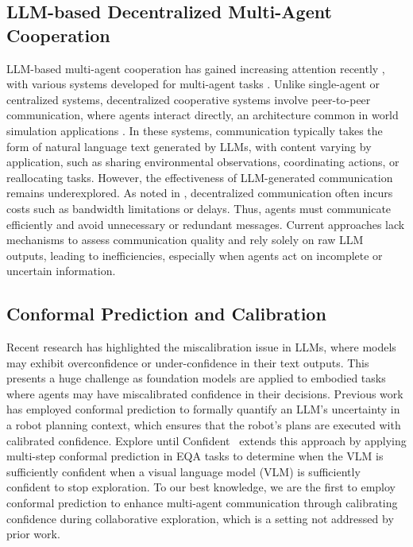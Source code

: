 \subsection{LLM-based Decentralized Multi-Agent Cooperation}
LLM-based multi-agent cooperation has gained increasing attention recently \cite{chan2023chateval,zhang2024lamma}, with various systems developed for multi-agent tasks \cite{hong2023metagpt,horton2023large,hua2023war,zhang2024towards,chen2024scalable,mandi2024roco}. 
Unlike single-agent or centralized systems, decentralized cooperative systems involve peer-to-peer communication, where agents interact directly, an architecture common in world simulation applications \cite{zhang2024agentcf,zhou2023sotopia}.
In these systems, communication typically takes the form of natural language text generated by LLMs, with content varying by application, such as sharing environmental observations, coordinating actions, or reallocating tasks. 
However, the effectiveness of LLM-generated communication remains underexplored. As noted in \cite{zhang2023building}, decentralized communication often incurs costs such as bandwidth limitations or delays. Thus, agents must communicate efficiently and avoid unnecessary or redundant messages. Current approaches lack mechanisms to assess communication quality and rely solely on raw LLM outputs, leading to inefficiencies, especially when agents act on incomplete or uncertain information.
\subsection{Conformal Prediction and Calibration}
Recent research has highlighted the miscalibration issue in LLMs, where models may exhibit overconfidence or under-confidence in their text outputs. 
This presents a huge challenge as foundation models are applied to embodied tasks where agents may have miscalibrated confidence in their decisions. Previous work \cite{ren2023robots,wang2024safe} has employed conformal prediction  \cite{shafer2008tutorial} to formally quantify an LLM’s uncertainty in a robot planning context, which ensures that the robot’s plans are executed with calibrated confidence.
Explore until Confident~\cite{ren2024explore} extends this approach by applying multi-step conformal prediction in EQA tasks to determine when the VLM is sufficiently confident when a visual language model (VLM) is sufficiently confident to stop exploration.
To our best knowledge, we are the first to employ conformal prediction to enhance multi-agent communication through calibrating confidence during collaborative exploration, which is a setting not addressed by prior work.
